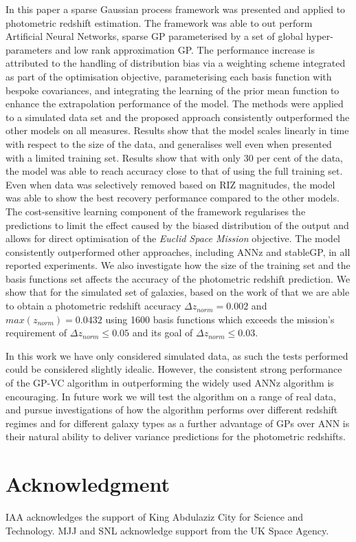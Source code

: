 \documentclass[useAMS,usenatbib,fleqn]{mn2e}
\begin{document}
In this paper a sparse Gaussian process framework was presented and applied to photometric redshift estimation. The framework was able to out perform Artificial Neural Networks, sparse GP parameterised by a set of global hyper-parameters and low rank approximation GP. The performance increase is attributed to the handling of distribution bias via a weighting scheme integrated as part of the optimisation objective, parameterising each basis function with bespoke covariances, and integrating the learning of the prior mean function to enhance the extrapolation performance of the model. The methods were applied to a simulated data set and the proposed approach consistently outperformed the other models on all measures. Results show that the model scales linearly in time with respect to the size of the data, and generalises well even when presented with a limited training set. Results show that with only 30 per cent of the data, the model was able to reach accuracy close to that of using the full training set. Even when data was selectively removed based on RIZ magnitudes, the model was able to show the best recovery performance compared to the other models. The cost-sensitive learning component of the framework regularises the predictions to limit the effect caused by the biased distribution of the output and allows for direct optimisation of the {\em Euclid Space Mission} objective. The model consistently outperformed other approaches, including ANNz and stableGP, in all reported experiments. We also investigate how the size of the training set and the basis functions set affects the accuracy of the photometric redshift prediction. We show that for the simulated set of galaxies, based on the work of \cite{jouvel09} that we are able to obtain a photometric redshift accuracy $\Delta z_{norm}  = 0.002$ and $max\left(z_{norm}\right)=0.0432$ using 1600 basis functions which exceeds the mission's requirement of $\Delta z_{norm} \le 0.05$ and its goal of $\Delta z_{norm} \le 0.03$. 

In this work we have only considered simulated data, as such the tests performed could be considered slightly idealic. However, the consistent strong performance of the GP-VC algorithm in outperforming the widely used ANNz algorithm is encouraging. In future work we will test the algorithm on a range of real data, and pursue investigations of how the algorithm performs over different redshift regimes and for different galaxy types as a further advantage of GPs over ANN is their natural ability to deliver variance predictions for the photometric redshifts.




\section*{Acknowledgment }
IAA acknowledges the support of King Abdulaziz City for Science and Technology.
MJJ and SNL acknowledge support from the UK Space Agency.

\footnotesize{


}

\label{lastpage}
\end{document}
